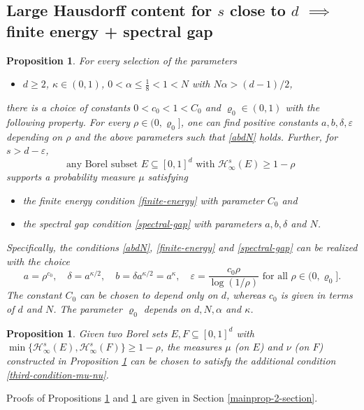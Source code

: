 \documentclass[a4paper,11pt]{amsart}
\newtheorem{prop}[thm]{\bf Proposition}
\numberwithin{equation}{section}
\begin{document}
\subsection{Large Hausdorff content for $s$ close to $d$ $\implies$ finite energy + spectral gap}  
\begin{prop}\label{mainprop-2}
For every selection of the parameters
\vskip0.1in
\begin{itemize} 
\item $d \geq 2$, $\kappa \in (0,1)$, $0 < \alpha \leq \frac18 < 1 < N$ with $N \alpha > (d-1)/2$, 
\end{itemize}
\vskip0.1in  
there is a choice of constants $0 < c_0 <  1 < C_0$ and $\varrho_0 \in (0,1)$ with the following property. For every $\rho \in (0, \varrho_0]$, one can find positive constants $a, b, \delta, \varepsilon$ depending on $\rho$ and the above parameters such  that \eqref{abdN} holds. Further, for $s > d - \varepsilon$, 
\[ \text{ any Borel subset $E \subseteq [0,1]^d$ with $\mathcal H_{\infty}^{s}(E) \geq 1 - \rho$ } \] 
supports a probability measure $\mu$ satisfying 
\vskip0.1in 
\begin{itemize} 
\item the finite energy condition \eqref{finite-energy} with parameter $C_0$ and 
\vskip0.1in 
\item the spectral gap condition \eqref{spectral-gap} with parameters $a, b, \delta$ and $N$. 
\end{itemize}
\vskip0.1in  
Specifically, the conditions \eqref{abdN}, \eqref{finite-energy} and \eqref{spectral-gap} can be realized with the choice 
\begin{equation}  a = \rho^{c_0}, \quad \delta = a^{\kappa/2}, \quad b = \delta a^{\kappa/2} = a^{\kappa}, \quad \varepsilon = \frac{c_0 \rho}{\log(1/\rho)} \text{ for all $\rho \in (0, \varrho_0]$.} \label{relation-abrho} \end{equation} 
The constant $C_0$ can be chosen to depend only on $d$, whereas $c_0$ is given in terms of $d$ and $N$. The parameter $\varrho_0$ depends on $d, N, \alpha$ and $\kappa$.  
\end{prop} 

\begin{prop} \label{mainprop-2'} 
Given two Borel sets $E, F \subseteq [0,1]^d$ with $\min\{\mathcal H_{\infty}^{s}(E), \mathcal H_{\infty}^{s}(F)\} \geq 1 - \rho$, the measures $\mu$ (on $E$) and $\nu$ (on $F$) constructed in Proposition \ref{mainprop-2} can be chosen to satisfy the additional condition \eqref{third-condition-mu-nu}.  
\end{prop}
\noindent Proofs of Propositions \ref{mainprop-2} and \ref{mainprop-2'} are given in Section \ref{mainprop-2-section}.
\end{document}
